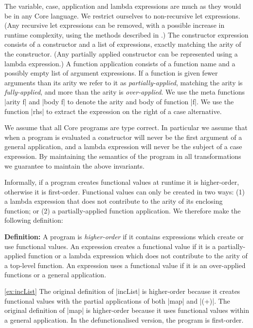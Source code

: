 \documentclass[preprint]{sigplanconf}
\newenvironment{definition}
    {\smallskip
     \noindent\textbf{Definition:}}
    {\noexample}
\begin{document}
The variable, case, application and lambda expressions are much as they would be in any Core language. We restrict ourselves to non-recursive let expressions. (Any recursive let expressions can be removed, with a possible increase in runtime complexity, using the methods described in \cite{me:thesis}.) The constructor expression consists of a constructor and a list of expressions, exactly matching the arity of the constructor. (Any partially applied constructor can be represented using a lambda expression.) A function application consists of a function name and a possibly empty list of argument expressions. If a function is given fewer arguments than its arity we refer to it as \textit{partially-applied}, matching the arity is \textit{fully-applied}, and more than the arity is \textit{over-applied}. We use the meta functions |arity f| and |body f| to denote the arity and body of function |f|. We use the function |rhs| to extract the expression on the right of a case alternative.

We assume that all Core programs are type correct. In particular we assume that when a program is evaluated a constructor will never be the first argument of a general application, and a lambda expression will never be the subject of a case expression. By maintaining the semantics of the program in all transformations we guarantee to maintain the above invariants.


Informally, if a program creates functional values at runtime it is higher-order, otherwise it is first-order. Functional values can only be created in two ways: (1) a lambda expression that does not contribute to the arity of its enclosing function; or (2) a partially-applied function application. We therefore make the following definition:

\begin{definition}
A program is \textit{higher-order} if it contains expressions which create or use functional values. An expression creates a functional value if it is a partially-applied function or a lambda expression which does not contribute to the arity of a top-level function. An expression uses a functional value if it is an over-applied functions or a general application.
\end{definition}

\begin{examplerevisit}{\ref{ex:incList}}
The original definition of |incList| is higher-order because it creates functional values with the partial applications of both |map| and |(+)|. The original definition of |map| is higher-order because it uses functional values within a general application. In the defunctionalised version, the program is first-order.
\end{examplerevisit}
\end{document}
